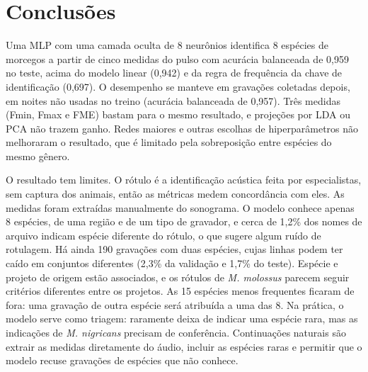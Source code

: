 \documentclass{sbrt}
\begin{document}
\section{Conclusões}

Uma MLP com uma camada oculta de 8 neurônios identifica 8 espécies de morcegos a partir de cinco medidas do pulso com acurácia balanceada de 0,959 no teste, acima do modelo linear (0,942) e da regra de frequência da chave de identificação (0,697). O desempenho se manteve em gravações coletadas depois, em noites não usadas no treino (acurácia balanceada de 0,957). Três medidas (Fmin, Fmax e FME) bastam para o mesmo resultado, e projeções por LDA ou PCA não trazem ganho. Redes maiores e outras escolhas de hiperparâmetros não melhoraram o resultado, que é limitado pela sobreposição entre espécies do mesmo gênero.

O resultado tem limites. O rótulo é a identificação acústica feita por especialistas, sem captura dos animais, então as métricas medem concordância com eles. As medidas foram extraídas manualmente do sonograma. O modelo conhece apenas 8 espécies, de uma região e de um tipo de gravador, e cerca de 1,2\% dos nomes de arquivo indicam espécie diferente do rótulo, o que sugere algum ruído de rotulagem. Há ainda 190 gravações com duas espécies, cujas linhas podem ter caído em conjuntos diferentes (2,3\% da validação e 1,7\% do teste). Espécie e projeto de origem estão associados, e os rótulos de \textit{M. molossus} parecem seguir critérios diferentes entre os projetos. As 15 espécies menos frequentes ficaram de fora: uma gravação de outra espécie será atribuída a uma das 8. Na prática, o modelo serve como triagem: raramente deixa de indicar uma espécie rara, mas as indicações de \textit{M. nigricans} precisam de conferência. Continuações naturais são extrair as medidas diretamente do áudio, incluir as espécies raras e permitir que o modelo recuse gravações de espécies que não conhece.
\end{document}
